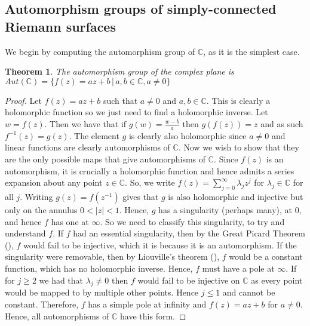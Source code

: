 \documentclass[11pt]{report}
\newtheorem{thm}{Theorem}[section]
\theoremstyle{definition}
\begin{document}
\subsection{Automorphism groups of simply-connected Riemann surfaces}
We begin by computing the automorphism group of $\mathbb{C}$, as it is the simplest case.
\begin{thm}\label{Aut(C)} 
  The automorphism group of the complex plane is ~\\$Aut(\mathbb{C})=\{f(z)=az+b \, \vert \, a, b \in  \mathbb{C}, a \neq 0\}$
\end{thm}
\begin{proof}
  Let $f(z) = az+b$ such that $a\neq 0$ and $a,b \in \mathbb{C}$. This is clearly a holomorphic function so we just need to find a holomorphic inverse. Let $w = f(z)$. Then we have that if $g(w) = \frac{w - b}{a}$ then $g(f(z))=z$ and as such $f^{-1}(z)=g(z)$. The element $g$ is clearly also holomorphic since $a \neq 0$ and linear functions are clearly automorphisms of $\mathbb{C}$. Now we wish to show that they are the only possible maps that give automorphisms of $\mathbb{C}$. \newline
  Since $f(z)$ is an automorphism, it is crucially a holomorphic function and hence admits a series expansion about any point $z \in \mathbb{C}$. So, we write $f(z) = \sum\limits_{j=0}^{\infty}\lambda_jz^j$ for $\lambda_j \in \mathbb{C}$ for all $j$. Writing $g(z)=f(z^{-1})$ gives that $g$ is also holomorphic and injective but only on the annulus $0 < |z| < 1$. Hence, $g$ has a singularity (perhaps many), at $0$, and hence $f$ has one at $\infty$. So we need to classify this singularity, to try and understand $f$. If $f$ had an essential singularity, then by the Great Picard Theorem (\cite[p.300]{conway}), $f$ would fail to be injective, which it is because it is an automorphism. If the singularity were removable, then by Liouville's theorem (\cite[p.122]{ahlfors}), $f$ would be a constant function, which has no holomorphic inverse. Hence, $f$ must have a pole at $\infty$. If for $j\geq 2$ we had that $\lambda_j \neq 0$ then $f$ would fail to be injective on $\mathbb{C}$ as every point would be mapped to by multiple other points. Hence $j \leq 1$ and cannot be constant. Therefore, $f$ has a simple pole at infinity and $f(z) = az + b$ for $a \neq 0$. Hence, all automorphisms of $\mathbb{C}$ have this form.
\end{proof}
\end{document}

